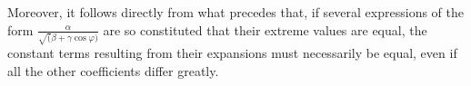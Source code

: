 \expandafter\def\csname HistoricalNoteText29\endcsname{Moreover, it follows directly from what precedes that, if several expressions of the form
$\frac{\alpha}{\surd(\beta+\gamma\cos\varphi)}$ are so constituted that their
extreme values are equal, the constant terms resulting from their expansions must necessarily be equal, even if all the other coefficients differ greatly.}
